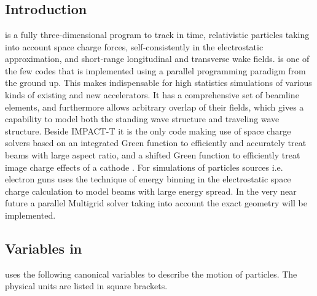 

\chapter{\opalt}
\label{chp:opalt}
\section{Introduction}
\opalt is a fully three-dimensional program to track in time, relativistic particles taking into account space charge forces, self-consistently in the electrostatic approximation, and short-range longitudinal and transverse wake fields. \opalt is one of the few
codes  that is implemented using a parallel programming paradigm from the ground up. This makes \opalt indispensable for
high statistics simulations of various kinds of existing and new accelerators. It has a comprehensive set of beamline
elements, and furthermore allows arbitrary overlap of their fields, which gives \opalt a capability
to model both the standing wave structure and traveling wave structure. Beside IMPACT-T it is the only code making use of
space charge solvers based on an integrated Green \cite{qiang2005, qiang2006-1,qiang2006-2} function to efficiently and accurately treat beams with
large aspect ratio, and a shifted Green function to efficiently treat image charge effects of a cathode \cite{fubiani2006, qiang2005, qiang2006-1,qiang2006-2}.
For simulations of particles sources i.e. electron guns \opalt uses the technique of  energy binning in the electrostatic space charge calculation to model beams with large
energy spread. In the very near future a parallel Multigrid solver taking into account the exact geometry will be implemented.

\section{Variables in \opalt}
\label{sec:variablesopalt}

\label{sec:opalt:canon}
\opalt uses the following canonical variables
to describe the motion of particles. The physical units are listed in square brackets.

